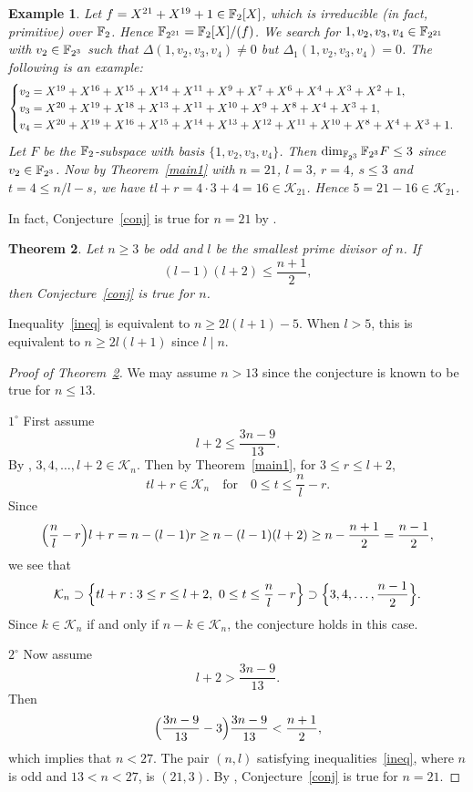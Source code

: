 \documentclass{amsart}
\newtheorem{thm}{Theorem}[section]
\newtheorem{exmp}[thm]{Example}
\numberwithin{equation}{section}
\theoremstyle{definition}
\newcommand{\f}{\Bbb F}
\begin{document}
\begin{exmp}\label{5inK21}\rm
Let $f=X^{21} + X^{19} + 1\in\f_2[X]$, which is irreducible (in fact, primitive) over $\f_2$. Hence $\f_{2^{21}}=\f_2[X]/(f)$. We search for $1,v_2,v_3,v_4\in\f_{2^{21}}$ with $v_2\in\f_{2^3}$ such that $\Delta(1,v_2,v_3,v_4)\ne 0$ but $\Delta_1(1,v_2,v_3,v_4)=0$. The following is an example:
\[
\begin{cases}
v_2=X^{19}+X^{16}+X^{15}+X^{14}+X^{11}+X^9+X^7+X^6+X^4+X^3+X^2+1,\cr
v_3=X^{20}+X^{19}+X^{18}+X^{13}+X^{11}+X^{10}+X^9+X^8+X^4+X^3+1,\cr
v_4=X^{20}+X^{19}+X^{16}+X^{15}+X^{14}+X^{13}+X^{12}+X^{11}+X^{10}+X^8+X^4+X^3+1.
\end{cases}
\]
Let $F$ be the $\f_2$-subspace with basis $\{1,v_2,v_3,v_4\}$. Then $\dim_{\f_{2^3}}\f_{2^3}F\le 3$ since $v_2\in\f_{2^3}$. Now by Theorem~\ref{main1} with $n=21$, $l=3$, $r=4$, $s\le 3$ and $t=4\le n/l-s$, we have $tl+r=4\cdot 3+4=16\in\mathcal K_{21}$. Hence $5=21-16\in\mathcal K_{21}$. 
\end{exmp}

\medskip
{} In fact, Conjecture~\ref{conj} is true for $n=21$ by \cite[Table~2]{Carlet-Hou}.

\medskip

\begin{thm}\label{main2}
Let $n\ge 3$ be odd and $l$ be the smallest prime divisor of $n$. If 
\begin{equation}\label{ineq}
(l-1)(l+2)\le \frac{n+1}2,
\end{equation}
then Conjecture~\ref{conj} is true for $n$.
\end{thm}

 Inequality~\eqref{ineq} is equivalent to $n\ge 2l(l+1)-5$. When $l>5$, this is equivalent to $n\ge 2l(l+1)$ since $l\mid n$.

\begin{proof}[Proof of Theorem~\ref{main2}]
We may assume $n> 13$ since the conjecture is known to be true for $n\le 13$.

\medskip
$1^\circ$ First assume 
\[
l+2\le\frac{3n-9}{13}.
\]
By \cite[Theorem~4.2]{Carlet-Hou}, $3,4,\dots,l+2\in\mathcal K_n$. Then by Theorem~\ref{main1}, for $3\le r\le l+2$,
\[
tl+r\in\mathcal K_n\quad \text{for}\quad 0\le t\le \frac nl-r.
\]
Since 
\[
\Bigl(\frac nl-r\Bigr)l+r=n-(l-1)r\ge n-(l-1)(l+2)\ge n-\frac{n+1}2=\frac{n-1}2,
\]
we see that
\[
\mathcal K_n\supset\Bigl\{tl+r:3\le r\le l+2,\ 0\le t\le \frac nl-r\Bigr\}\supset\Bigl\{3,4,\dots,\frac{n-1}2\Bigr\}.
\]
Since $k\in\mathcal K_n$ if and only if $n-k\in\mathcal K_n$, the conjecture holds in this case.

\medskip
$2^\circ$ Now assume
\begin{equation}\label{l+2}
l+2>\frac{3n-9}{13}.
\end{equation}
Then
\[
\Bigl(\frac{3n-9}{13}-3\Bigr)\frac{3n-9}{13}<\frac{n+1}2,
\]
which implies that $n<27$. The pair $(n,l)$ satisfying inequalities~\eqref{ineq}, where $n$ is odd and $13< n<27$, is $(21,3)$. By \cite[Table~2]{Carlet-Hou}, Conjecture~\ref{conj} is true for $n=21$.
\end{proof}
\end{document}
